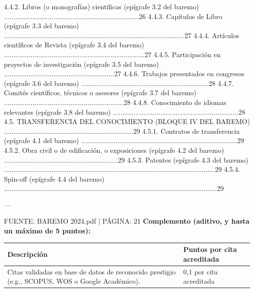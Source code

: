 \documentclass{article}
\begin{document}
\begin{itemize}
\begin{itemize}
\begin{scriptsize}
                  4.4.2. Libros (o monografías) científicas (epígrafe 3.2 del baremo) .......................................................................26
                  4.4.3. Capítulos de Libro (epígrafe 3.3 del baremo) ...............................................................................................27
                  4.4.4. Artículos científicos de Revista (epígrafe 3.4 del baremo) ..........................................................................27
                  4.4.5. Participación en proyectos de investigación (epígrafe 3.5 del baremo) ..........................................................27
                  4.4.6. Trabajos presentados en congresos (epígrafe 3.6 del baremo) ...................................................................28
                  4.4.7. Comités científicos, técnicos o asesores (epígrafe 3.7 del baremo) ...............................................................28
                  4.4.8. Conocimiento de idiomas relevantes (epígrafe 3.8 del baremo) ..................................................................28
                  4.5. TRANSFERENCIA DEL CONOCIMIENTO (BLOQUE IV DEL BAREMO) ....................................................................29
                  4.5.1. Contratos de transferencia (epígrafe 4.1 del baremo) ..................................................................................29
                  4.5.2. Obra civil o de edificación, o exposiciones (epígrafe 4.2 del baremo) ............................................................29
                  4.5.3. Patentes (epígrafe 4.3 del baremo) ...............................................................................................................29
                  4.5.4. Spin-off (epígrafe 4.4 del baremo) ................................................................................................................29

                  ---

                  FUENTE: BAREMO 2024.pdf | PÁGINA: 21
                  \textbf{Complemento (aditivo, y hasta un máximo de 5 puntos):}

                  \vspace{0.4cm}
                  \begin{table}[h!]\centering\renewcommand{\arraystretch}{1.3}
                    \begin{tabular}{|p{}|p{}|}\hline
                      Descripción                                                                                      & Puntos por cita acreditada \\\hline
                      Citas validadas en base de datos de reconocido prestigio (e.g., SCOPUS, WOS o Google Académico). & 0,1 por cita acreditada    \\\hline
                    \end{tabular}\end{table}
                  \vspace{0.4cm}


\end{scriptsize}
\end{itemize}
\end{itemize}
\end{document}
